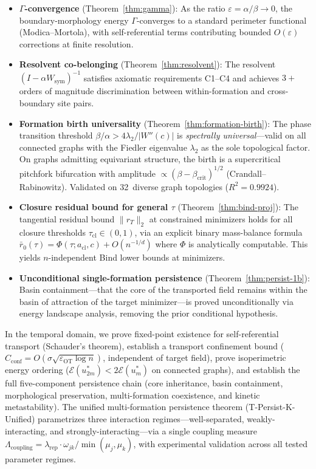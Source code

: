 \documentclass[lettersize,journal]{IEEEtran}
\begin{document}
\begin{itemize}
\item \textbf{$\Gamma$-convergence} (Theorem~\ref{thm:gamma}): As the ratio $\varepsilon = \alpha/\beta \to 0$, the boundary-morphology energy $\Gamma$-converges to a standard perimeter functional (Modica--Mortola), with self-referential terms contributing bounded $O(\varepsilon)$ corrections at finite resolution.

\item \textbf{Resolvent co-belonging} (Theorem~\ref{thm:resolvent}): The resolvent $(I - \alpha W_{\mathrm{sym}})^{-1}$ satisfies axiomatic requirements C1--C4 and achieves $3+$ orders of magnitude discrimination between within-formation and cross-boundary site pairs.

\item \textbf{Formation birth universality} (Theorem~\ref{thm:formation-birth}): The phase transition threshold $\beta/\alpha > 4\lambda_2/|W''(c)|$ is \emph{spectrally universal}---valid on all connected graphs with the Fiedler eigenvalue $\lambda_2$ as the sole topological factor. On graphs admitting equivariant structure, the birth is a supercritical pitchfork bifurcation with amplitude $\propto (\beta - \beta_{\mathrm{crit}})^{1/2}$ (Crandall--Rabinowitz). Validated on 32~diverse graph topologies ($R^2 = 0.9924$).

\item \textbf{Closure residual bound for general $\tau$} (Theorem~\ref{thm:bind-proj}): The tangential residual bound $\|r_T\|_2$ at constrained minimizers holds for all closure thresholds $\tau_{\mathrm{cl}} \in (0,1)$, via an explicit binary mass-balance formula $\bar{r}_0(\tau) = \Phi(\tau; a_{\mathrm{cl}}, c) + O(n^{-1/d})$ where $\Phi$ is analytically computable. This yields $n$-independent Bind lower bounds at minimizers.

\item \textbf{Unconditional single-formation persistence} (Theorem~\ref{thm:persist-1b}): Basin containment---that the core of the transported field remains within the basin of attraction of the target minimizer---is proved unconditionally via energy landscape analysis, removing the prior conditional hypothesis.
\end{itemize}

In the temporal domain, we prove fixed-point existence for self-referential transport (Schauder's theorem), establish a transport confinement bound ($C_{\mathrm{conf}} = O(\sigma\sqrt{\varepsilon_{\mathrm{OT}}\log n})$, independent of target field), prove isoperimetric energy ordering ($\mathcal{E}(u^*_{2m}) < 2\mathcal{E}(u^*_m)$ on connected graphs), and establish the full five-component persistence chain (core inheritance, basin containment, morphological preservation, multi-formation coexistence, and kinetic metastability). The unified multi-formation persistence theorem (T-Persist-K-Unified) parametrizes three interaction regimes---well-separated, weakly-interacting, and strongly-interacting---via a single coupling measure $\Lambda_{\mathrm{coupling}} = \lambda_{\mathrm{rep}} \cdot \omega_{jk} / \min(\mu_j, \mu_k)$, with experimental validation across all tested parameter regimes.
\end{document}

